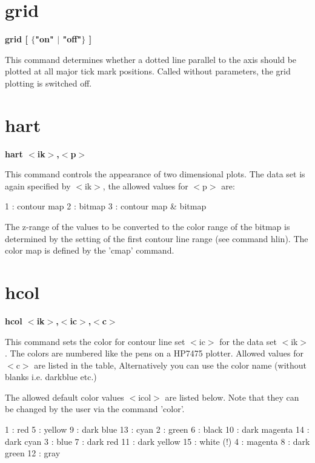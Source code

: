 \section{grid}
{\bf grid [ $ \{$"on" $| $ "off"$\} $ ] \par }
\par
\vspace{3pt}
This command determines whether a dotted line parallel to the axis 
should be plotted at all major tick mark positions. Called without 
parameters, the grid plotting is switched off. 
\section{hart}
{\bf hart $ <$ik$> $,$ <$p$> $ \par }
\par
\vspace{3pt}
This command controls the appearance of two dimensional plots. The 
data set is again specified by $ <$ik$> $, the allowed values for $ <$p$> $ are: 
\par
\begin{MacVerbatim}
  1 : contour map
  2 : bitmap
  3 : contour map & bitmap
\end{MacVerbatim}
The z-range of the values to be converted to the color range of the 
bitmap is determined by the setting of the first contour line range 
(see command hlin). The color map is defined by the 'cmap' command. 
\section{hcol}
{\bf hcol $ <$ik$> $,$ <$ic$> $,$ <$c$> $ \par }
\par
\vspace{3pt}
This command sets the color for contour line set $ <$ic$> $ for the data 
set $ <$ik$> $. The colors are numbered like the pens on a HP7475 plotter. 
Allowed values for $ <$c$> $ are listed in the table, Alternatively you 
can use the color name (without blanks i.e. darkblue etc.) 
\par
The allowed default color values $ <$icol$> $ are listed below. Note 
that they can be changed by the user via the command 'color'. 
\par
\begin{MacVerbatim}
  1 : red       5 : yellow        9 : dark blue      13 : cyan
  2 : green     6 : black        10 : dark magenta   14 : dark cyan
  3 : blue      7 : dark red     11 : dark yellow    15 : white (!)
  4 : magenta   8 : dark green   12 : gray
\end{MacVerbatim}
